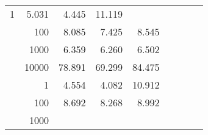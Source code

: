 \begin{table}
\begin{tabular}{rrrrrrrrr}
					\multirow{ 1 }{*}{ 1 } &
					
						
							    
							    
	                           5.031 & 4.445 & 11.119  \\
	                
	            
					 &  
					 
					\multirow{ 1 }{*}{ 100 } &
					
						
							    
							    
	                           8.085 & 7.425 & 8.545  \\
	                
	            
					 &  
					 
					\multirow{ 1 }{*}{ 1000 } &
					
						
							    
							    
	                           6.359 & 6.260 & 6.502  \\
	                
	            
					 &  
					 
					\multirow{ 1 }{*}{ 10000 } &
					
						
							    
							    
	                           78.891 & 69.299 & 84.475  \\
	                
	            
	        
				\noalign{\smallskip}\hline
				\multirow{ 4 }{*}{ 160000 } &
				
					
					 
					\multirow{ 1 }{*}{ 1 } &
					
						
							    
							    
	                           4.554 & 4.082 & 10.912  \\
	                
	            
					 &  
					 
					\multirow{ 1 }{*}{ 100 } &
					
						
							    
							    
	                           8.692 & 8.268 & 8.992  \\
	                
	            
					 &  
					 
					\multirow{ 1 }{*}{ 1000 } &
					
						
							    

\end{tabular}
\end{table}
